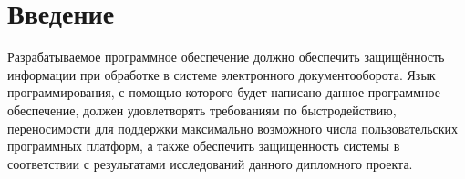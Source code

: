 \section{Введение} \label{technologic_introduction}

Разрабатываемое программное обеспечение должно обеспечить защищённость информации при обработке в системе электронного документооборота. Язык программирования, с помощью которого будет написано данное программное обеспечение, должен удовлетворять требованиям по быстродействию, переносимости для поддержки максимально возможного числа пользовательских программных платформ, а также обеспечить защищенность системы в соответствии с результатами исследований данного дипломного проекта.